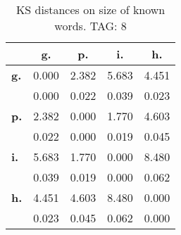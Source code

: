 \begin{table}[h!]
\begin{center}
\begin{tabular}{| l || c | c | c | c |}\hline
 & {\bf g.} & {\bf p.} & {\bf i.} & {\bf h.} \\\hline\hline
{\bf g.} & 0.000 & 2.382 & 5.683 & 4.451 \\
{\bf } & 0.000 & 0.022 & 0.039 & 0.023 \\\hline
{\bf p.} & 2.382 & 0.000 & 1.770 & 4.603 \\
{\bf } & 0.022 & 0.000 & 0.019 & 0.045 \\\hline
{\bf i.} & 5.683 & 1.770 & 0.000 & 8.480 \\
{\bf } & 0.039 & 0.019 & 0.000 & 0.062 \\\hline
{\bf h.} & 4.451 & 4.603 & 8.480 & 0.000 \\
{\bf } & 0.023 & 0.045 & 0.062 & 0.000 \\\hline
\end{tabular}
\caption{KS distances on size of known words. TAG: 8}
\end{center}
\end{table}